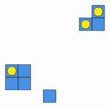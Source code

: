 \documentclass[12pt]{article}
\begin{document}
\[\begin{tikzpicture}[x=0.75pt,y=0.75pt,yscale=-1,xscale=1]
    \draw  [fill={rgb, 255:red, 74; green, 144; blue, 226 }  ,fill opacity=1 ] (192,44.37) -- (212,44.37) -- (212,64.37) -- (192,64.37) -- cycle ;
    \draw  [fill={rgb, 255:red, 74; green, 144; blue, 226 }  ,fill opacity=1 ] (192,64.37) -- (212,64.37) -- (212,84.37) -- (192,84.37) -- cycle ;
    \draw  [fill={rgb, 255:red, 74; green, 144; blue, 226 }  ,fill opacity=1 ] (172,64.37) -- (192,64.37) -- (192,84.37) -- (172,84.37) -- cycle ;
    \draw  [fill={rgb, 255:red, 248; green, 231; blue, 28 }  ,fill opacity=1 ] (174.87,74.37) .. controls (174.87,70.43) and (178.06,67.24) .. (182,67.24) .. controls (185.94,67.24) and (189.13,70.43) .. (189.13,74.37) .. controls (189.13,78.31) and (185.94,81.5) .. (182,81.5) .. controls (178.06,81.5) and (174.87,78.31) .. (174.87,74.37) -- cycle ;
    \draw  [fill={rgb, 255:red, 248; green, 231; blue, 28 }  ,fill opacity=1 ] (194.87,54.37) .. controls (194.87,50.43) and (198.06,47.24) .. (202,47.24) .. controls (205.94,47.24) and (209.13,50.43) .. (209.13,54.37) .. controls (209.13,58.31) and (205.94,61.5) .. (202,61.5) .. controls (198.06,61.5) and (194.87,58.31) .. (194.87,54.37) -- cycle ;
    \draw  [fill={rgb, 255:red, 74; green, 144; blue, 226 }  ,fill opacity=1 ] (115,178.37) -- (135,178.37) -- (135,198.37) -- (115,198.37) -- cycle ;
    \draw  [fill={rgb, 255:red, 74; green, 144; blue, 226 }  ,fill opacity=1 ] (55,138.37) -- (75,138.37) -- (75,158.37) -- (55,158.37) -- cycle ;
    \draw  [fill={rgb, 255:red, 74; green, 144; blue, 226 }  ,fill opacity=1 ] (75,138.37) -- (95,138.37) -- (95,158.37) -- (75,158.37) -- cycle ;
    \draw  [fill={rgb, 255:red, 74; green, 144; blue, 226 }  ,fill opacity=1 ] (75,158.37) -- (95,158.37) -- (95,178.37) -- (75,178.37) -- cycle ;
    \draw  [fill={rgb, 255:red, 74; green, 144; blue, 226 }  ,fill opacity=1 ] (55,158.37) -- (75,158.37) -- (75,178.37) -- (55,178.37) -- cycle ;
    \draw  [fill={rgb, 255:red, 248; green, 231; blue, 28 }  ,fill opacity=1 ] (57.87,148.37) .. controls (57.87,144.43) and (61.06,141.24) .. (65,141.24) .. controls (68.94,141.24) and (72.13,144.43) .. (72.13,148.37) .. controls (72.13,152.31) and (68.94,155.5) .. (65,155.5) .. controls (61.06,155.5) and (57.87,152.31) .. (57.87,148.37) -- cycle ;

\end{tikzpicture}\]
\end{document}
